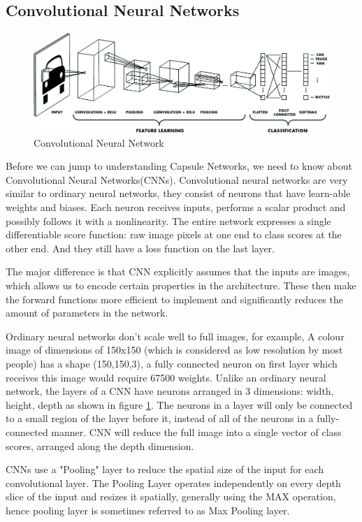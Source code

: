 \documentclass{vldb}
\begin{document}
\subsection{Convolutional Neural Networks}
\begin{figure}[H]
\centering\includegraphics[width=\linewidth]{../Final_Report/images/CNN.jpg}
\caption{Convolutional Neural Network}
\label{fig:cnn}
\end{figure}
Before we can jump to understanding Capsule Networks, we need to know about Convolutional Neural Networks(CNNs). Convolutional neural networks are very similar to ordinary neural networks, they consist of neurons that have learn-able weights and biases. Each neuron receives inputs, performs a scalar product and possibly follows it with a nonlinearity. The entire network expresses a single differentiable score function: raw image pixels at one end to class scores at the other end. And they still have a loss function on the last layer.\par\bigskip
The major difference is that CNN explicitly assumes that the inputs are images, which allows us to encode certain properties in the architecture. These then make the forward functions more efficient to implement and significantly reduces the amount of parameters in the network.\par\bigskip
Ordinary neural networks don’t scale well to full images, for example, A colour image of dimensions of 150x150 (which is considered as low resolution by most people) has a shape (150,150,3), a fully connected neuron on first layer which receives this image would require 67500 weights. Unlike an ordinary neural network, the layers of a CNN have neurons arranged in 3 dimensions: width, height, depth as shown in figure \ref{fig:cnn}. The neurons in a layer will only be connected to a small region of the layer before it, instead of all of the neurons in a fully-connected manner. CNN  will reduce the full image into a single vector of class scores, arranged along the depth dimension.\par\bigskip
CNNs use a "Pooling" layer to reduce the spatial size of the input for each convolutional layer. The Pooling Layer operates independently on every depth slice of the input and resizes it spatially, generally using the MAX operation, hence pooling layer is sometimes referred to as Max Pooling layer.
\end{document}
